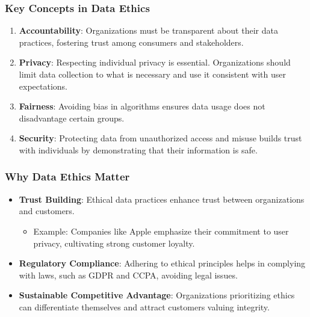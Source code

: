 \documentclass{beamer}
\begin{document}
\begin{frame}[fragile]
    \frametitle{Key Concepts in Data Ethics}
    \begin{enumerate}
        \item \textbf{Accountability}: Organizations must be transparent about their data practices, fostering trust among consumers and stakeholders.
        
        \item \textbf{Privacy}: Respecting individual privacy is essential. Organizations should limit data collection to what is necessary and use it consistent with user expectations.
        
        \item \textbf{Fairness}: Avoiding bias in algorithms ensures data usage does not disadvantage certain groups.
        
        \item \textbf{Security}: Protecting data from unauthorized access and misuse builds trust with individuals by demonstrating that their information is safe.
    \end{enumerate}
\end{frame}

\begin{frame}[fragile]
    \frametitle{Why Data Ethics Matter}
    \begin{itemize}
        \item \textbf{Trust Building}: Ethical data practices enhance trust between organizations and customers.
        \begin{itemize}
            \item Example: Companies like Apple emphasize their commitment to user privacy, cultivating strong customer loyalty.
        \end{itemize}
        
        \item \textbf{Regulatory Compliance}: Adhering to ethical principles helps in complying with laws, such as GDPR and CCPA, avoiding legal issues.
        
        \item \textbf{Sustainable Competitive Advantage}: Organizations prioritizing ethics can differentiate themselves and attract customers valuing integrity.
    \end{itemize}
\end{frame}
\end{document}
